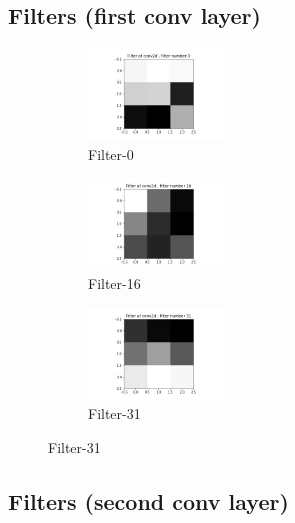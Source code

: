 \subsection{Filters (first conv layer)}
\begin{figure}[!htbp]
\begin{subfigure}
\centering
\includegraphics[angle=0,width=0.4\textwidth]{assign-2/logs/vis/filter-conv2d-0.jpg}
\caption{Filter-0}
\end{subfigure}
\begin{subfigure}
\centering
\includegraphics[angle=0,width=0.4\textwidth]{assign-2/logs/vis/filter-conv2d-16.jpg}
\caption{Filter-16}
\end{subfigure}
\begin{subfigure}
\centering
\includegraphics[angle=0,width=0.4\textwidth]{assign-2/logs/vis/filter-conv2d-31.jpg}
\caption{Filter-31}
\end{subfigure}
\end{figure}

\subsection{Filters (second conv layer)}

